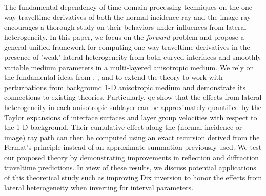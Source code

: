 The fundamental dependency of time-domain processing techniques on the one-way traveltime derivatives of both the normal-incidence ray and the image ray encourages a thorough study on their behaviors under influences from lateral heterogeneity. In this paper, we focus on the \textit{forward} problem and propose a general unified framework for computing one-way traveltime derivatives in the presence of 'weak' lateral heterogeneity from both curved interfaces and smoothly variable medium parameters in a multi-layered anisotropic medium. We rely on the fundamental ideas from \cite{blias1981}, \cite{lynnclaerbout}, and \cite{bliasgrit1984} to extend the theory to work with perturbations from background 1-D anisotropic medium and demonstrate its connections to existing theories. Particularly, qe show that the effects from lateral heterogeneity in each anisotropic sublayer can be approximately quantified by the Taylor expansions of interface surfaces and layer group velocities with respect to the 1-D background. Their cumulative effect along the (normal-incidence or image) ray path can then be computed using an exact recursion derived from the Fermat's principle instead of an approximate summation previously used. We test our proposed theory by demonstrating improvements in reflection and diffraction traveltime predictions. In view of these results, we discuss potential applications of this theoretical study such as improving Dix inversion to honor the effects from lateral heterogeneity when inverting for interval parameters. 

